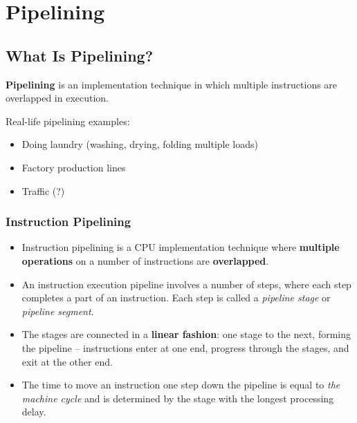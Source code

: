 \section{Pipelining}
\label{sec:pipelining}

\subsection{What Is Pipelining?}
\label{sec:pipelining-idea}

\begin{definition}[Pipelining]
\textbf{Pipelining} is an implementation technique in which multiple
instructions are overlapped in execution.
\end{definition}

Real-life pipelining examples:
\begin{itemize}
  \item Doing laundry (washing, drying, folding multiple loads)
  \item Factory production lines
  \item Traffic (?)
\end{itemize}

\subsubsection{Instruction Pipelining}

\begin{definition}
\leavevmode
\begin{itemize}
  \item Instruction pipelining is a CPU implementation technique where
  \textbf{multiple operations} on a number of instructions are \textbf{overlapped}.
  \item An instruction execution pipeline involves a number of steps, where each
  step completes a part of an instruction. Each step is called a \emph{pipeline
  stage} or \emph{pipeline segment}.
  \item The stages are connected in a \textbf{linear fashion}: one stage to the
  next, forming the pipeline -- instructions enter at one end, progress through
  the stages, and exit at the other end.
  \item The time to move an instruction one step down the pipeline is equal to
  \emph{the machine cycle} and is determined by the stage with the longest
  processing delay.
\end{itemize}
\end{definition}

